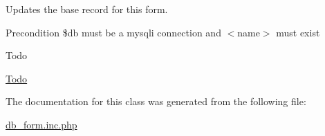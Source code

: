 Updates the base record for this form. 

\begin{DoxyPrecond}{Precondition}
\$db must be a mysqli connection and $<$name$>$ must exist 
\end{DoxyPrecond}
\begin{DoxyRefDesc}{Todo}
\item[\hyperlink{todo__todo000002}{Todo}]\end{DoxyRefDesc}


The documentation for this class was generated from the following file\-:\begin{DoxyCompactItemize}
\item 
\hyperlink{db__form_8inc_8php}{db\-\_\-form.\-inc.\-php}\end{DoxyCompactItemize}
